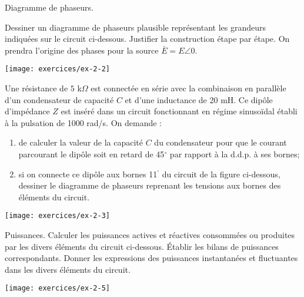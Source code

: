 \begin{exercise}{Diagramme de phaseurs.}\label{ex:RSE-2}

Dessiner un diagramme de phaseurs plausible représentant les
grandeurs indiquées sur le circuit ci-dessous. Justifier
la construction étape par étape. On prendra l'origine des phases
pour la source $\bar{E}=E\angle 0$.
\begin{center}
\texttt{[image: exercices/ex-2-2]}
\end{center}
\end{exercise}

\begin{exercise}{}\label{ex:RSE-3}
Une résistance de $5$ k$\Omega$ est connectée en série avec la
combinaison en parallèle d'un condensateur de capacité $C$ et d'une
inductance de 20 mH. Ce dipôle d'impédance $Z$ est inséré dans un
circuit fonctionnant en régime sinusoïdal établi à la pulsation de
1000 rad/s. On demande :
\begin{enumerate}
	\item de calculer la valeur de la capacité $C$ du condensateur pour
	que le courant parcourant le dipôle soit en retard de 45$^{\circ}$
	par rapport à la d.d.p. à ses bornes;
	\item si on connecte ce dipôle aux bornes 11$^{'}$ du circuit de la figure ci-dessous,
	dessiner le diagramme de phaseurs reprenant les tensions
	aux bornes des éléments du circuit.
\end{enumerate}
\begin{center}
\texttt{[image: exercices/ex-2-3]}
\end{center}

\end{exercise}


\begin{exercise}{Puissances.}\label{ex:RSE-5}
Calculer les puissances actives et réactives consommées ou
produites par les divers éléments du circuit ci-dessous. Établir les bilans de puissances
correspondants. Donner les expressions des puissances instantanées et
fluctuantes dans les divers éléments du circuit.
\begin{center}
\texttt{[image: exercices/ex-2-5]}
\end{center}

\end{exercise}

